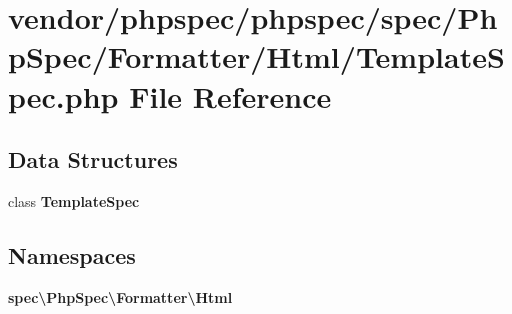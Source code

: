 \section{vendor/phpspec/phpspec/spec/\+Php\+Spec/\+Formatter/\+Html/\+Template\+Spec.php File Reference}
\label{_template_spec_8php}
\subsection*{Data Structures}
\begin{DoxyCompactItemize}
\item 
class {\bf Template\+Spec}
\end{DoxyCompactItemize}
\subsection*{Namespaces}
\begin{DoxyCompactItemize}
\item 
 {\bf spec\textbackslash{}\+Php\+Spec\textbackslash{}\+Formatter\textbackslash{}\+Html}
\end{DoxyCompactItemize}
